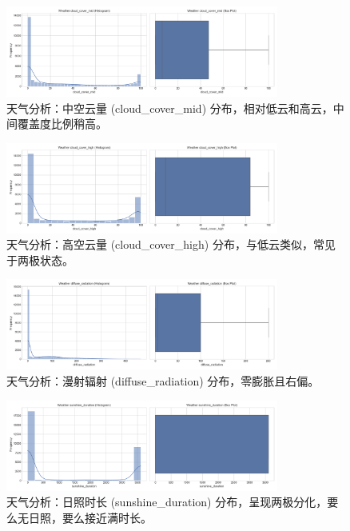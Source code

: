 \documentclass{article} %
\begin{document}
\begin{figure}[H]
    \centering
    \includegraphics[width=0.8\textwidth]{../plots/weather_distribution_cloud_cover_mid.png}
    \caption{天气分析：中空云量 (cloud\_cover\_mid) 分布，相对低云和高云，中间覆盖度比例稍高。} %
    \label{fig:weather_dist_cloud_mid}
\end{figure}

\begin{figure}[H]
    \centering
    \includegraphics[width=0.8\textwidth]{../plots/weather_distribution_cloud_cover_high.png}
    \caption{天气分析：高空云量 (cloud\_cover\_high) 分布，与低云类似，常见于两极状态。} %
    \label{fig:weather_dist_cloud_high}
\end{figure}

\begin{figure}[H]
    \centering
    \includegraphics[width=0.8\textwidth]{../plots/weather_distribution_diffuse_radiation.png}
    \caption{天气分析：漫射辐射 (diffuse\_radiation) 分布，零膨胀且右偏。} %
    \label{fig:weather_dist_diffuse_radiation}
\end{figure}

\begin{figure}[H]
    \centering
    \includegraphics[width=0.8\textwidth]{../plots/weather_distribution_sunshine_duration.png}
    \caption{天气分析：日照时长 (sunshine\_duration) 分布，呈现两极分化，要么无日照，要么接近满时长。} %
    \label{fig:weather_dist_sunshine}
\end{figure}
\end{document}
